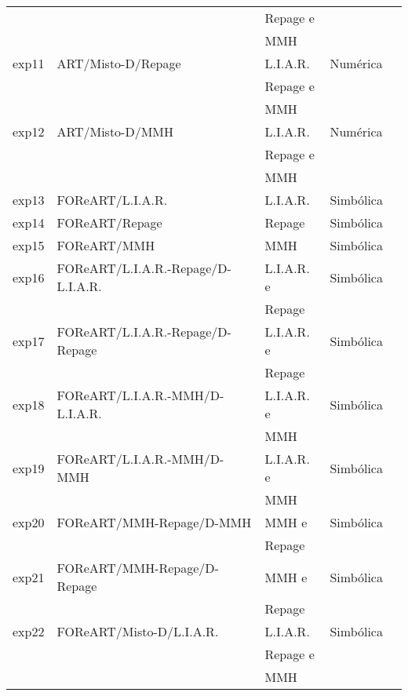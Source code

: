 \documentclass[]{article}
\begin{document}
\begin{table}[ht]
\begin{center}
\begin{tabular}{|l|l|l|l|l|}
			       &                      & Repage e & \\
			       &                      & MMH   & \\
		\hline
			exp11  & ART/Misto-D/Repage & L.I.A.R.   & Numérica\\
			       &                    & Repage e & \\
                   &                    & MMH   & \\
        \hline
			exp12  & ART/Misto-D/MMH & L.I.A.R.   & Numérica\\
			       &                 & Repage e & \\
                   &                 & MMH   & \\
		\hline
			exp13  & FOReART/L.I.A.R. & L.I.A.R. & Simbólica\\
		\hline
			exp14  & FOReART/Repage & Repage & Simbólica\\
		\hline
			exp15  & FOReART/MMH & MMH & Simbólica\\
		\hline
			exp16  & FOReART/L.I.A.R.-Repage/D-L.I.A.R. & L.I.A.R. e & Simbólica\\
			       &                                & Repage     & \\
		\hline
			exp17  & FOReART/L.I.A.R.-Repage/D-Repage & L.I.A.R. e & Simbólica\\
			       &                              & Repage     & \\
		\hline
			exp18  & FOReART/L.I.A.R.-MMH/D-L.I.A.R. & L.I.A.R. e & Simbólica\\
			       &                             & MMH        & \\
		\hline
			exp19  & FOReART/L.I.A.R.-MMH/D-MMH & L.I.A.R. e & Simbólica\\
			       &                        & MMH        & \\
		\hline
			exp20  & FOReART/MMH-Repage/D-MMH & MMH e  & Simbólica\\
			       &                      & Repage & \\
		\hline
			exp21  & FOReART/MMH-Repage/D-Repage & MMH e  & Simbólica\\
			       &                         & Repage & \\
		\hline
			exp22  & FOReART/Misto-D/L.I.A.R. & L.I.A.R.   & Simbólica\\
			       &                      & Repage e & \\
			       &                      & MMH   & \\
		\hline

\end{tabular}
\end{center}
\end{table}
\end{document}

